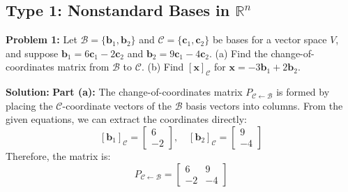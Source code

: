\documentclass[11pt]{article}
\begin{document}
\subsection{Type 1: Nonstandard Bases in $\mathbb{R}^n$}

\textbf{Problem 1:} Let $\mathcal{B} = \{\mathbf{b}_1, \mathbf{b}_2\}$ and $\mathcal{C} = \{\mathbf{c}_1, \mathbf{c}_2\}$ be bases for a vector space $V$, and suppose $\mathbf{b}_1 = 6\mathbf{c}_1 - 2\mathbf{c}_2$ and $\mathbf{b}_2 = 9\mathbf{c}_1 - 4\mathbf{c}_2$.
(a) Find the change-of-coordinates matrix from $\mathcal{B}$ to $\mathcal{C}$.
(b) Find $[\mathbf{x}]_{\mathcal{C}}$ for $\mathbf{x} = -3\mathbf{b}_1 + 2\mathbf{b}_2$.

\textbf{Solution:}
\textbf{Part (a):} The change-of-coordinates matrix $P_{\mathcal{C} \leftarrow \mathcal{B}}$ is formed by placing the $\mathcal{C}$-coordinate vectors of the $\mathcal{B}$ basis vectors into columns.
From the given equations, we can extract the coordinates directly:
\[ [\mathbf{b}_1]_{\mathcal{C}} = \begin{bmatrix} 6 \\ -2 \end{bmatrix}, \quad [\mathbf{b}_2]_{\mathcal{C}} = \begin{bmatrix} 9 \\ -4 \end{bmatrix} \]
Therefore, the matrix is:
\[ P_{\mathcal{C} \leftarrow \mathcal{B}} = \begin{bmatrix} 6 & 9 \\ -2 & -4 \end{bmatrix} \]
\end{document}
